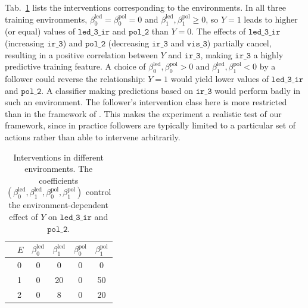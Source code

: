 Tab.~\ref{tab:interventions_d2} lists the interventions corresponding to the environments. In all three training environments, $\beta^{\mathrm{led}}_0 = \beta^{\mathrm{pol}}_0 = 0$ and $\beta^{\mathrm{led}}_1, \beta^{\mathrm{pol}}_1 \geq 0$, so $Y = 1$ leads to higher (or equal) values of $\mathtt{led\_3\_ir}$ and $\mathtt{pol\_2}$ than $Y = 0$. The effects of $\mathtt{led\_3\_ir}$ (increasing $\mathtt{ir\_3}$) and $\mathtt{pol\_2}$ (decreasing $\mathtt{ir\_3}$ and $\mathtt{vis\_3}$) partially cancel, resulting in a positive correlation between $Y$ and $\mathtt{ir\_3}$, making $\mathtt{ir\_3}$ a highly predictive training feature. A choice of $\beta^{\mathrm{led}}_0, \beta^{\mathrm{pol}}_0 > 0$ and $\beta^{\mathrm{led}}_1, \beta^{\mathrm{pol}}_1 < 0$ by a follower 
could 
reverse the relationship: $Y = 1$ would yield lower values of $\mathtt{led\_3\_ir}$ and $\mathtt{pol\_2}$. A classifier making predictions based on $\mathtt{ir\_3}$ 
would 
perform badly
in such an environment. The follower's intervention class here is more restricted than in
the framework of . This makes the experiment a
realistic test of our framework, since in practice followers are typically
limited to a particular set of actions rather than able to intervene
arbitrarily.





\begin{table}[t]
    \centering
    \caption{%
      Interventions in different environments. The coefficients $(\beta^{\mathrm{led}}_0, \beta^{\mathrm{led}}_1, \beta^{\mathrm{pol}}_0, \beta^{\mathrm{pol}}_1)$ control the environment-dependent effect of $Y$ on $\mathtt{led\_3\_ir}$ and $\mathtt{pol\_2}$.%
    }
    \label{tab:interventions_d2}
    \small
    \begin{tabular}{@{}clcccc@{}}
        \toprule
        & $E$ & $\beta^{\mathrm{led}}_0$ & $\beta^{\mathrm{led}}_1$
            & $\beta^{\mathrm{pol}}_0$ & $\beta^{\mathrm{pol}}_1$ \\
        \midrule
        & 0  & 0 & 0 & 0 & 0 \\
        & 1  & 0 & 20 & 0 & 50 \\
        & 2  & 0 & 8 & 0 & 20 \\
        \bottomrule
    \end{tabular}
\end{table}



